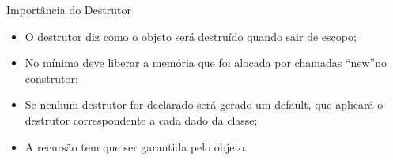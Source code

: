 \documentclass[12pt,table,xcolor={dvipsnames}]{beamer}
\begin{document}
\begin{frame}[fragile]{Importância do Destrutor}
\begin{itemize}
\item O destrutor diz como o objeto será destruído quando sair de escopo;
\item No mínimo deve liberar a memória que foi alocada por chamadas “new”no construtor;
\item Se nenhum destrutor for declarado será gerado um default, que aplicará o destrutor correspondente a cada dado da classe;
\item A recursão tem que ser garantida pelo objeto.
\end{itemize}
\end{frame}
\end{document}

